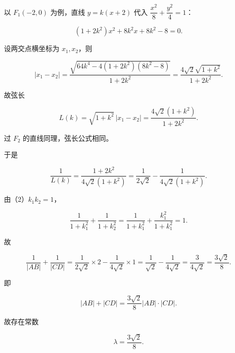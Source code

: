 \begin{answer}
以 $F_1(-2,0)$ 为例，直线 $y=k(x+2)$ 代入 $\dfrac{x^2}{8}+\dfrac{y^2}{4}=1$：

\nopagebreak[4]
\[(1+2k^2)x^2+8k^2x+8k^2-8=0.\]

设两交点横坐标为 $x_1,x_2$，则

\nopagebreak[4]
\[|x_1-x_2|=\frac{\sqrt{64k^4-4(1+2k^2)(8k^2-8)}}{1+2k^2}
=\frac{4\sqrt2\sqrt{1+k^2}}{1+2k^2}.\]

故弦长

\nopagebreak[4]
\[L(k)=\sqrt{1+k^2}\,|x_1-x_2|
=\frac{4\sqrt2(1+k^2)}{1+2k^2}.\]

过 $F_2$ 的直线同理，弦长公式相同。

于是

\nopagebreak[4]
\[\frac1{L(k)}=\frac{1+2k^2}{4\sqrt2(1+k^2)}
=\frac1{2\sqrt2}-\frac1{4\sqrt2(1+k^2)}.\]

由（2）$k_1k_2=1$，

\nopagebreak[4]
\[\frac1{1+k_1^2}+\frac1{1+k_2^2}
=\frac1{1+k_1^2}+\frac{k_1^2}{1+k_1^2}=1.\]

故

\nopagebreak[4]
\[\frac1{|AB|}+\frac1{|CD|}
=\frac1{2\sqrt2}\times2-\frac1{4\sqrt2}\times1
=\frac1{\sqrt2}-\frac1{4\sqrt2}
=\frac3{4\sqrt2}=\frac{3\sqrt2}{8}.\]

即

\nopagebreak[4]
\[|AB|+|CD|=\frac{3\sqrt2}{8}|AB|\cdot|CD|.\]

故存在常数

\nopagebreak[4]
\[\lambda=\frac{3\sqrt2}{8}.\]


\end{answer}
